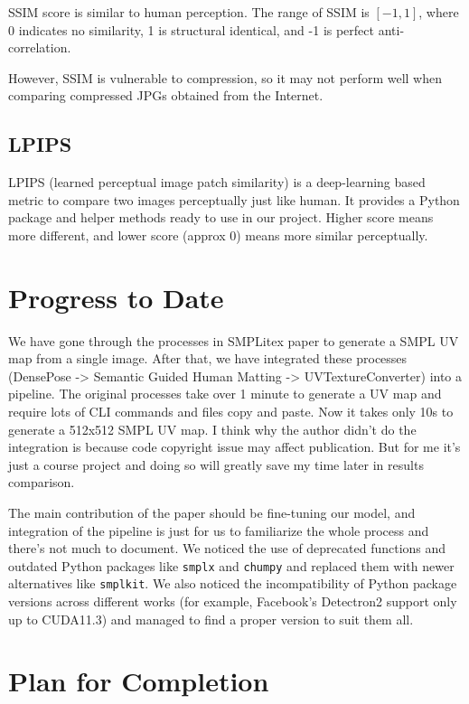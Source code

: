 \documentclass[acmtog]{acmart}
\begin{document}
SSIM score is similar to human perception. The range of SSIM is \([-1,1]\), where 0 indicates no similarity, 1 is structural identical, and -1 is perfect anti-correlation.

However, SSIM is vulnerable to compression, so it may not perform well when comparing compressed JPGs obtained from the Internet.

\subsection{LPIPS}
LPIPS (learned perceptual image patch similarity) \cite{zhang2018unreasonable} is a deep-learning based metric to compare two images perceptually just like human. It provides a Python package and helper methods ready to use in our project. Higher score means more different, and lower score (approx 0) means more similar perceptually.



\section{Progress to Date}

We have gone through the processes in SMPLitex paper to generate a SMPL UV map from a single image. After that, we have integrated these processes (DensePose -> Semantic Guided Human Matting -> UVTextureConverter) into a pipeline. The original processes take over 1 minute to generate a UV map and require lots of CLI commands and files copy and paste. Now it takes only 10s to generate a 512x512 SMPL UV map. I think why the author didn't do the integration is because code copyright issue may affect publication. But for me it's just a course project and doing so will greatly save my time later in results comparison.

The main contribution of the paper should be fine-tuning our model, and integration of the pipeline is just for us to familiarize the whole process and there's not much to document. We noticed the use of deprecated functions and outdated Python packages like \texttt{smplx} and \texttt{chumpy} and replaced them with newer alternatives like \texttt{smplkit}. We also noticed the incompatibility of Python package versions across different works (for example, Facebook's Detectron2 support only up to CUDA11.3) and managed to find a proper version to suit them all.

\section{Plan for Completion}
\end{document}
